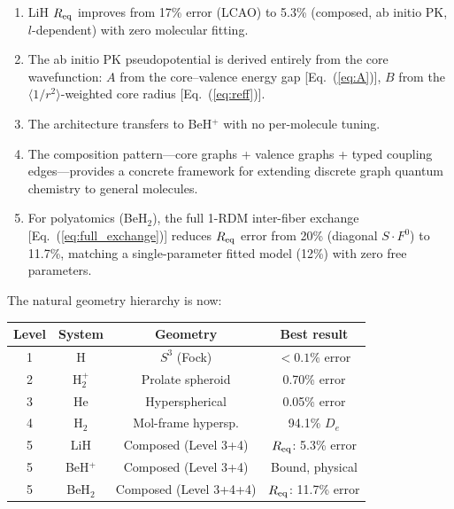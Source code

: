 \documentclass[aps,pra,twocolumn,superscriptaddress,longbibliography,floatfix]{revtex4-2}
\begin{document}
\begin{enumerate}
\item LiH $R_{\rm eq}$ improves from 17\% error (LCAO) to 5.3\%
  (composed, ab initio PK, $l$-dependent) with zero molecular fitting.

\item The ab initio PK pseudopotential is derived entirely from the
  core wavefunction: $A$ from the core--valence energy gap
  [Eq.~(\ref{eq:A})], $B$ from the $\langle 1/r^2 \rangle$-weighted
  core radius [Eq.~(\ref{eq:reff})].

\item The architecture transfers to BeH$^+$ with no per-molecule
  tuning.

\item The composition pattern---core graphs + valence graphs + typed
  coupling edges---provides a concrete framework for extending discrete
  graph quantum chemistry to general molecules.

\item For polyatomics (BeH$_2$), the full 1-RDM inter-fiber exchange
  [Eq.~(\ref{eq:full_exchange})] reduces $R_{\rm eq}$ error from
  20\% (diagonal $S \cdot F^0$) to 11.7\%, matching a single-parameter
  fitted model (12\%) with zero free parameters.
\end{enumerate}

The natural geometry hierarchy is now:
\begin{center}
\begin{tabular}{cccc}
\toprule
Level & System & Geometry & Best result \\
\midrule
1 & H       & $S^3$ (Fock)           & $<0.1\%$ error \\
2 & H$_2^+$ & Prolate spheroid       & 0.70\% error \\
3 & He      & Hyperspherical         & 0.05\% error \\
4 & H$_2$   & Mol-frame hypersp.     & 94.1\% $D_e$ \\
5 & LiH     & Composed (Level 3+4)   & $R_{\rm eq}$: 5.3\% error \\
5 & BeH$^+$ & Composed (Level 3+4)   & Bound, physical \\
5 & BeH$_2$ & Composed (Level 3+4+4) & $R_{\rm eq}$: 11.7\% error \\
\bottomrule
\end{tabular}
\end{center}
\end{document}
